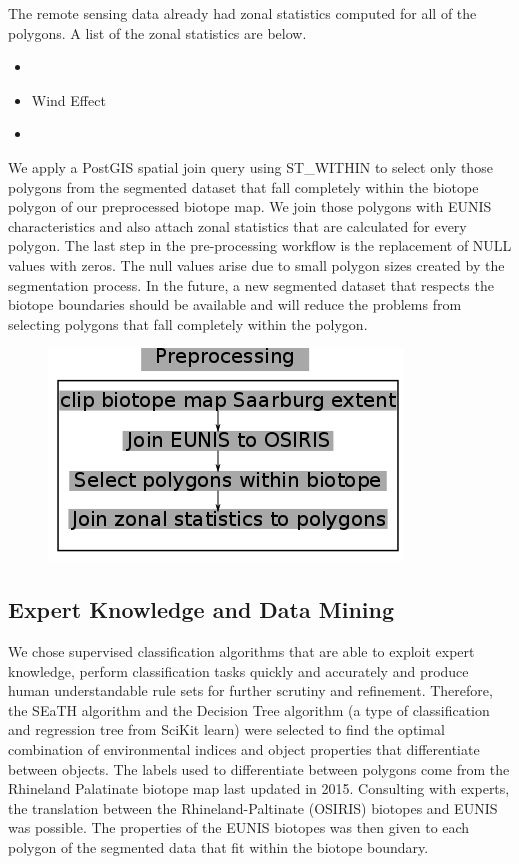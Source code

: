 \documentclass[authoryear, review,12pt,number]{elsarticle}
\begin{document}
The remote sensing data already had zonal statistics computed for all of the
polygons. A list of the zonal statistics are below.
\begin{itemize}
  \item 
  \item Wind Effect
  \item  
\end{itemize}
We apply a PostGIS spatial join query using ST\_WITHIN to select only those
polygons from the segmented dataset that fall completely within the biotope
polygon of our preprocessed biotope map. We join those polygons
with EUNIS characteristics and also attach zonal statistics that are calculated
for every polygon. The last step in the pre-processing workflow is the
replacement of NULL values with zeros. The null values arise due to small
polygon sizes created by the segmentation process. In the future, a new
segmented dataset that respects the biotope boundaries should be available and
will reduce the problems from selecting polygons that fall completely within the
polygon.

\begin{figure}
	\includegraphics[width=\textwidth]{diagrams/preprocessing_workflow.png}
\end{figure}


\subsection{Expert Knowledge and Data Mining}
We chose supervised classification algorithms that are able to exploit expert
knowledge, perform classification tasks quickly and accurately and produce human
understandable rule sets for further scrutiny and refinement. Therefore, the
SEaTH algorithm and the Decision Tree algorithm (a type of classification and regression
tree from SciKit learn) were selected to find the optimal combination of environmental indices and
object properties that differentiate between objects. The labels used to
differentiate between polygons come from the Rhineland Palatinate biotope map
last updated in 2015. Consulting with experts, the translation between the
Rhineland-Paltinate (OSIRIS) biotopes and EUNIS was possible. The properties of
the EUNIS biotopes was then given to each polygon of the segmented data that
fit within the biotope boundary.
\end{document}
